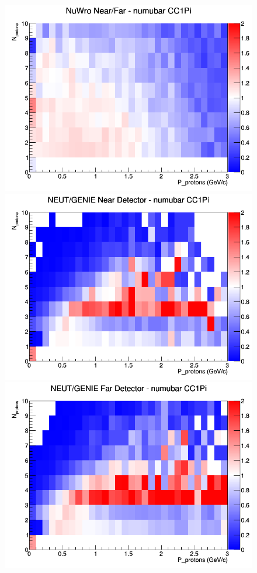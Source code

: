 \begin{figure}[h]
\endminipage
{}
\includegraphics[width=\linewidth]{N_P/nominal/protons/ratios/CC1Pi_NuWro_numubar_NF_N_P.png}
\endminipage
\newline
{}
\includegraphics[width=\linewidth]{N_P/nominal/protons/ratios/CC1Pi_NEUT_GENIE_numubar_near_N_P.png}
\endminipage
{}
\includegraphics[width=\linewidth]{N_P/nominal/protons/ratios/CC1Pi_NEUT_GENIE_numubar_far_N_P.png}

\end{figure}
